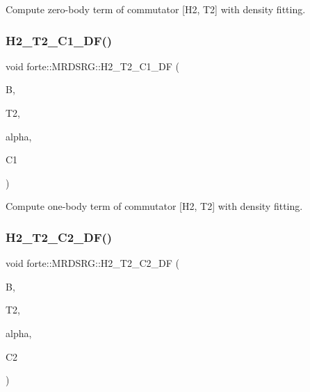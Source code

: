 Compute zero-\/body term of commutator \mbox{[}H2, T2\mbox{]} with density fitting. 

\mbox{\label{classforte_1_1_m_r_d_s_r_g_ac7db5ffe78f4e71f2cda880a4359764e}} 
\subsubsection{\texorpdfstring{H2\+\_\+\+T2\+\_\+\+C1\+\_\+\+D\+F()}{H2\_T2\_C1\_DF()}}
{\footnotesize\ttfamily void forte\+::\+M\+R\+D\+S\+R\+G\+::\+H2\+\_\+\+T2\+\_\+\+C1\+\_\+\+DF (\begin{DoxyParamCaption}\item[{Blocked\+Tensor \&}]{B,  }\item[{Blocked\+Tensor \&}]{T2,  }\item[{const double \&}]{alpha,  }\item[{Blocked\+Tensor \&}]{C1 }\end{DoxyParamCaption})\hspace{0.3cm}{\ttfamily [protected]}}



Compute one-\/body term of commutator \mbox{[}H2, T2\mbox{]} with density fitting. 

\mbox{\label{classforte_1_1_m_r_d_s_r_g_ad7bcc90a9b428c2f653238d5b297572b}} 
\subsubsection{\texorpdfstring{H2\+\_\+\+T2\+\_\+\+C2\+\_\+\+D\+F()}{H2\_T2\_C2\_DF()}}
{\footnotesize\ttfamily void forte\+::\+M\+R\+D\+S\+R\+G\+::\+H2\+\_\+\+T2\+\_\+\+C2\+\_\+\+DF (\begin{DoxyParamCaption}\item[{Blocked\+Tensor \&}]{B,  }\item[{Blocked\+Tensor \&}]{T2,  }\item[{const double \&}]{alpha,  }\item[{Blocked\+Tensor \&}]{C2 }\end{DoxyParamCaption})\hspace{0.3cm}{\ttfamily [protected]}}



